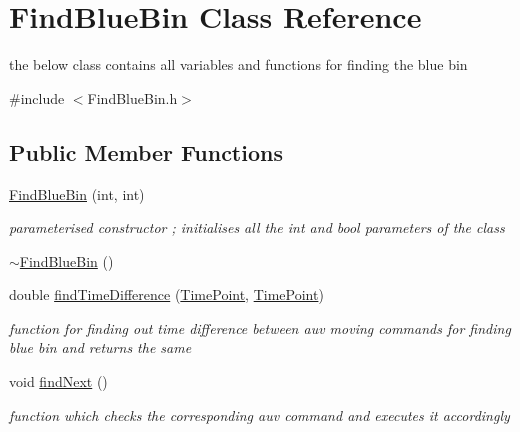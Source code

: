 \hypertarget{classFindBlueBin}{}\section{Find\+Blue\+Bin Class Reference}
\label{classFindBlueBin}


the below class contains all variables and functions for finding the blue bin  




{\ttfamily \#include $<$Find\+Blue\+Bin.\+h$>$}

\subsection*{Public Member Functions}
\begin{DoxyCompactItemize}
\item 
\hyperlink{classFindBlueBin_a15529364387c5c3f901b6adeb4d23534}{Find\+Blue\+Bin} (int, int)
\begin{DoxyCompactList}\small\item\em parameterised constructor ; initialises all the int and bool parameters of the class \end{DoxyCompactList}\item 
\hyperlink{classFindBlueBin_a616687b3a366380ca736bd606d4609ac}{$\sim$\+Find\+Blue\+Bin} ()
\item 
double \hyperlink{classFindBlueBin_a72f533d6fbce5872c5fa20260c3192bc}{find\+Time\+Difference} (\hyperlink{thruster__driver_8cpp_ad3e807c387dc076de974ff7eac67ad81}{Time\+Point}, \hyperlink{thruster__driver_8cpp_ad3e807c387dc076de974ff7eac67ad81}{Time\+Point})
\begin{DoxyCompactList}\small\item\em function for finding out time difference between auv moving commands for finding blue bin and returns the same \end{DoxyCompactList}\item 
void \hyperlink{classFindBlueBin_a136cd022a0ebacfb92ebf5c650c1019f}{find\+Next} ()
\begin{DoxyCompactList}\small\item\em function which checks the corresponding auv command and executes it accordingly \end{DoxyCompactList}\end{DoxyCompactItemize}
